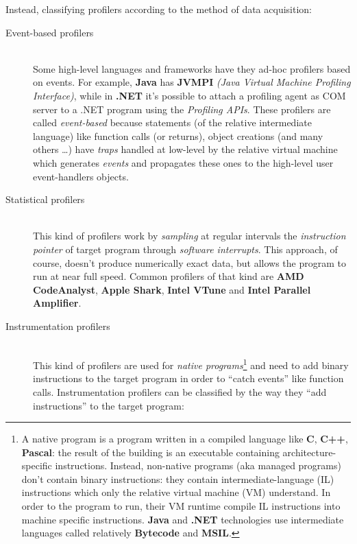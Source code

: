 \documentclass[a4paper,11pt]{report}
\begin{document}
\begin{flushleft}
Instead, classifying profilers according to the method of data acquisition:
\end{flushleft}


\begin{description}
\item[Event-based profilers] \hfill \\
Some high-level languages and frameworks have they ad-hoc profilers based on
events. For example, \textbf{Java} has \textbf{JVMPI} \textit{(Java Virtual
Machine Profiling Interface)}, while in \textbf{.NET} it's possible to attach a
profiling agent as COM server to a .NET program using the \emph{Profiling APIs}.
These profilers are called \emph{event-based} because statements (of the
relative intermediate language) like function calls (or returns), object
creations (and many others \ldots) have \emph{traps} handled at low-level by the
relative virtual machine which generates \emph{events} and propagates these ones
to the high-level user event-handlers objects.

\item[Statistical profilers] \hfill \\
This kind of profilers work by \emph{sampling} at regular intervals the
\emph{instruction pointer} of target program through \emph{software interrupts}.
This approach, of course, doesn't produce numerically exact data, but allows the
program to run at near full speed. Common profilers of that kind are \textbf{AMD
CodeAnalyst}, \textbf{Apple Shark}, \textbf{Intel VTune} and \textbf{Intel
Parallel Amplifier}.

\item[Instrumentation profilers] \hfill \\
This kind of profilers are used for \emph{native programs}\footnote{A native
program is a program written in a compiled language like \textbf{C},
\textbf{C++}, \textbf{Pascal}: the result of the building is an executable
containing architecture-specific instructions. Instead, non-native programs (aka
managed programs) don't contain binary instructions: they contain
intermediate-language (IL) instructions which only the relative virtual machine
(VM) understand. In order to the program to run, their VM runtime compile IL
instructions into machine specific instructions. \textbf{Java} and \textbf{.NET}
technologies use intermediate languages called relatively \textbf{Bytecode} and
\textbf{MSIL}.} and need to add binary instructions to the target program in
order to ``catch events'' like function calls. Instrumentation profilers can be
classified by the way they ``add instructions'' to the target program:


\end{description}
\end{document}
